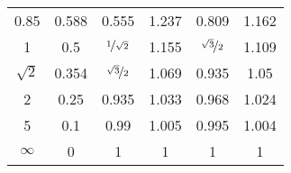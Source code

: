 \documentclass{article}[11pt]
\begin{document}
\begin{table}[H]
\begin{tabular}{cccccc}
0.85                     & 0.588                     & 0.555                                      & 1.237                                                                                            & 0.809                                      & 1.162                                                                                            \\  
1                        & 0.5                       & $\nicefrac{1}{\sqrt{2}}$                   & 1.155                                                                                            & $\nicefrac{\sqrt{3}}{2}$                   & 1.109                                                                                            \\  
$\sqrt{2}$               & 0.354                     & $\nicefrac{\sqrt{3}}{2}$                   & 1.069                                                                                            & 0.935                                      & 1.05                                                                                             \\
2                        & 0.25                      & 0.935                                      & 1.033                                                                                            & 0.968                                      & 1.024                                                                                            \\ 
5                        & 0.1                       & 0.99                                       & 1.005                                                                                            & 0.995                                      & 1.004                                                                                            \\ 
$\infty$                 & 0                         & 1                                          & 1                                                                                                & 1                                          & 1                                                                                                \\ \toprule
\end{tabular}
\label{tab:char-fs}
\end{table}
\end{document}

